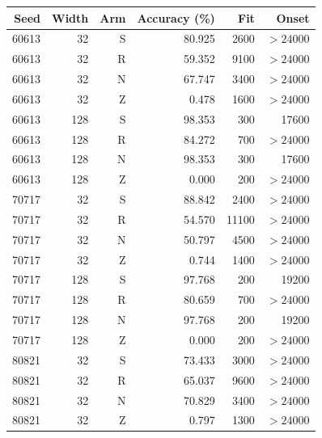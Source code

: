 \begin{tabular}{rrrrrr}
\toprule
Seed & Width & Arm & Accuracy (\%) & Fit & Onset \\
\midrule
60613 & 32 & S & 80.925 & 2600 & $>24000$ \\
60613 & 32 & R & 59.352 & 9100 & $>24000$ \\
60613 & 32 & N & 67.747 & 3400 & $>24000$ \\
60613 & 32 & Z & 0.478 & 1600 & $>24000$ \\
60613 & 128 & S & 98.353 & 300 & 17600 \\
60613 & 128 & R & 84.272 & 700 & $>24000$ \\
60613 & 128 & N & 98.353 & 300 & 17600 \\
60613 & 128 & Z & 0.000 & 200 & $>24000$ \\
70717 & 32 & S & 88.842 & 2400 & $>24000$ \\
70717 & 32 & R & 54.570 & 11100 & $>24000$ \\
70717 & 32 & N & 50.797 & 4500 & $>24000$ \\
70717 & 32 & Z & 0.744 & 1400 & $>24000$ \\
70717 & 128 & S & 97.768 & 200 & 19200 \\
70717 & 128 & R & 80.659 & 700 & $>24000$ \\
70717 & 128 & N & 97.768 & 200 & 19200 \\
70717 & 128 & Z & 0.000 & 200 & $>24000$ \\
80821 & 32 & S & 73.433 & 3000 & $>24000$ \\
80821 & 32 & R & 65.037 & 9600 & $>24000$ \\
80821 & 32 & N & 70.829 & 3400 & $>24000$ \\
80821 & 32 & Z & 0.797 & 1300 & $>24000$ \\
\bottomrule
\end{tabular}
